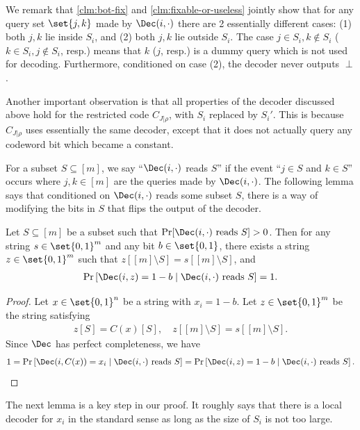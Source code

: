 We remark that \cref{clm:bot-fix} and \cref{clm:fixable-or-useless} jointly show that for any query set $\set{j,k}$ made by $\Dec(i,\cdot)$ there are 2 essentially different cases: (1) both $j, k$ lie inside $S_i$, and (2) both $j, k$ lie outside $S_i$. The case $j \in S_i, k\notin S_i$ ($k \in S_i, j\notin S_i$, resp.) means that $k$ ($j$, resp.) is a dummy query which is not used for decoding. Furthermore, conditioned on case (2), the decoder never outputs $\perp$.

Another important observation is that all properties of the decoder discussed above hold for the restricted code $C_{J|\rho}$, with $S_i$ replaced by $S_i'$. This is because $C_{J|\rho}$ uses essentially the same decoder, except that it does not actually query any codeword bit which became a constant.

For a subset $S \subseteq [m]$,
we say ``$\Dec(i,\cdot)$ reads $S$'' if the event ``$j \in S$ and $k \in S$'' occurs where $j, k \in [m]$ are the queries made by $\Dec(i,\cdot)$. The following lemma says that conditioned on $\Dec(i,\cdot)$ reads some subset $S$, there is a way of modifying the bits in $S$ that flips the output of the decoder.

\begin{lemma} \label{lem:conditional-zero}
Let $S \subseteq [m]$ be a subset such that $\Pr[\Dec(i,\cdot)\textup{ reads }S]>0$. Then for any string $s \in \set{0,1}^m$ and any bit $b \in \set{0,1}$, there exists a string $z \in \set{0,1}^m$ such that $z[[m]\setminus S]=s[[m]\setminus S]$, and 
\begin{align*}
	\Pr\left[ \Dec(i, z) = 1-b \mid \Dec(i,\cdot)\textup{ reads }S \right] = 1.
\end{align*}
\end{lemma}
\begin{proof}
Let $x \in \set{0,1}^{n}$ be a string with $x_i=1-b$. Let $z \in \set{0,1}^{m}$ be the string satisfying 
\begin{align*}
z[S] = C(x)[S], \quad z[[m]\setminus S] = s[[m]\setminus S]. 
\end{align*}
Since $\Dec$ has perfect completeness, we have
\begin{align*}
	1 = \Pr\left[ \Dec(i, C(x)) = x_i \mid \Dec(i,\cdot)\textup{ reads }S \right] = \Pr\left[ \Dec(i, z) = 1-b \mid \Dec(i,\cdot)\textup{ reads }S \right].
\end{align*}
\end{proof}

The next lemma is a key step in our proof. It roughly says that there is a local decoder for $x_i$ in the standard sense as long as the size of $S_{i}$ is not too large.

